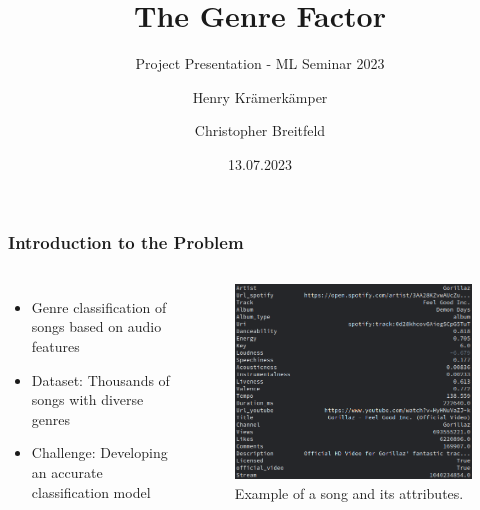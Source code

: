 \documentclass[8pt]{beamer}
\title{The Genre Factor}
\subtitle{Project Presentation - ML Seminar 2023}
\author{Henry Krämerkämper\\%
  \and%
  Christopher Breitfeld}
\institute{Technische Universität Dortmund}
\date{13.07.2023}
\begin{document}
\begin{frame}
  \titlepage
\end{frame}

\begin{frame}
\frametitle{Introduction to the Problem}
  \begin{columns}
    \begin{itemize}
      \item Genre classification of songs based on audio features
      \item Dataset: Thousands of songs with diverse genres
      \item Challenge: Developing an accurate classification model
    \end{itemize}
    \begin{figure}
      \centering
      \includegraphics[scale=0.3]{figures/Beispielsong.png}
      \caption{Example of a song and its attributes.}
    \end{figure}
  \end{columns}
\end{frame}
\end{document}
